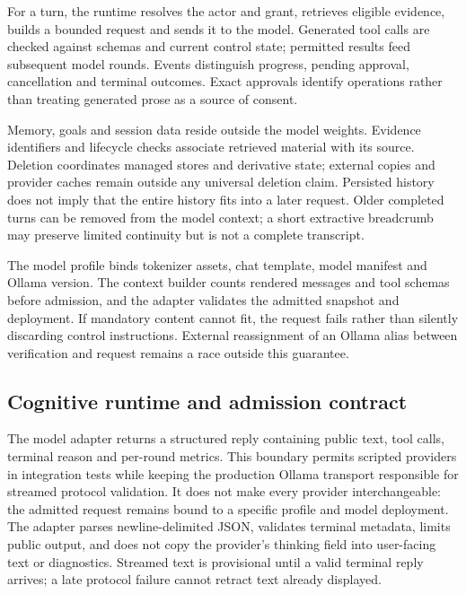 \documentclass[11pt,a4paper]{article}
\begin{document}
For a turn, the runtime resolves the actor and grant, retrieves eligible evidence, builds a bounded request and sends it to the model. Generated tool calls are checked against schemas and current control state; permitted results feed subsequent model rounds. Events distinguish progress, pending approval, cancellation and terminal outcomes. Exact approvals identify operations rather than treating generated prose as a source of consent.

Memory, goals and session data reside outside the model weights. Evidence identifiers and lifecycle checks associate retrieved material with its source. Deletion coordinates managed stores and derivative state; external copies and provider caches remain outside any universal deletion claim. Persisted history does not imply that the entire history fits into a later request. Older completed turns can be removed from the model context; a short extractive breadcrumb may preserve limited continuity but is not a complete transcript.

The model profile binds tokenizer assets, chat template, model manifest and Ollama version. The context builder counts rendered messages and tool schemas before admission, and the adapter validates the admitted snapshot and deployment. If mandatory content cannot fit, the request fails rather than silently discarding control instructions. External reassignment of an Ollama alias between verification and request remains a race outside this guarantee.

\subsection{Cognitive runtime and admission contract}
The model adapter returns a structured reply containing public text, tool calls, terminal reason and per-round metrics. This boundary permits scripted providers in integration tests while keeping the production Ollama transport responsible for streamed protocol validation. It does not make every provider interchangeable: the admitted request remains bound to a specific profile and model deployment. The adapter parses newline-delimited JSON, validates terminal metadata, limits public output, and does not copy the provider's thinking field into user-facing text or diagnostics. Streamed text is provisional until a valid terminal reply arrives; a late protocol failure cannot retract text already displayed.
\end{document}
